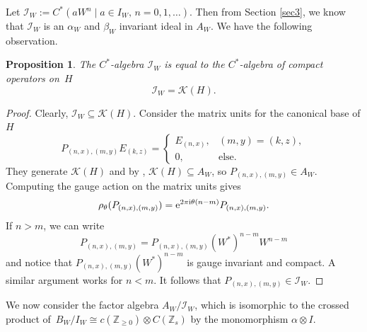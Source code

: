 \documentclass[pdftex]{sigma}
\newcommand{\Z}{{\mathbb Z}}
\numberwithin{equation}{section}
\newtheorem{Proposition}[Theorem]{Proposition}
 { \theoremstyle{definition}
\newtheorem{Definition}[Theorem]{Definition}
\newtheorem{Note}[Theorem]{Note}
\newtheorem{Example}[Theorem]{Example}
\newtheorem{Remark}[Theorem]{Remark} }
\begin{document}
Let $\mathcal{I}_W := C^*(aW^n \mid a\in I_W,\, n=0,1,\dots)$. Then from Section \ref{sec3}, we know that $\mathcal{I}_W$ is an $\alpha_W$ and $\beta_W$ invariant ideal in $A_W$.
We have the following observation.
\begin{Proposition}\label{IWStructure}
The $C^*$-algebra $\mathcal{I}_W$ is equal to the $C^*$-algebra of compact operators on~$H$
\begin{equation*}
\mathcal{I}_W=\mathcal{K}(H).
\end{equation*}
\end{Proposition}
\begin{proof} Clearly, $\mathcal{I}_W\subseteq \mathcal{K}(H)$. Consider the matrix units for the canonical base of $H$
\begin{equation*}
P_{(n,x),(m,y)} E_{(k,z)} = \begin{cases}
E_{(n,x)}, & (m,y)=(k,z) ,\\ 0, & \text{else}.
\end{cases}
\end{equation*}
They generate $\mathcal{K}(H)$ and by \cite[Proposition 7.4]{HKMP3}, $\mathcal{K}(H)\subseteq A_W$, so $P_{(n,x),(m,y)} \in A_W$.
Computing the gauge action on the matrix units gives
\begin{equation*}
\rho_\theta(P_{(n,x),(m,y)} )={\rm e}^{2\pi {\rm i}\theta(n-m)}P_{(n,x),(m,y)} .
\end{equation*}
If $n> m$, we can write
\begin{equation*}
P_{(n,x),(m,y)} =P_{(n,x),(m,y)} (W^*)^{n-m}W^{n-m}
\end{equation*}
and notice that $P_{(n,x),(m,y)} (W^*)^{n-m}$ is gauge invariant and compact. A similar argument works for $n< m$. It follows that $P_{(n,x),(m,y)}\in \mathcal{I}_W$.
\end{proof}

We now consider the factor algebra $A_W/\mathcal{I}_W$, which is isomorphic to the crossed product of~$B_W/I_W\cong c(\Z_{\ge0}) \otimes C(\Z_s)$ by the monomorphism $\alpha\otimes I$.
\end{document}
